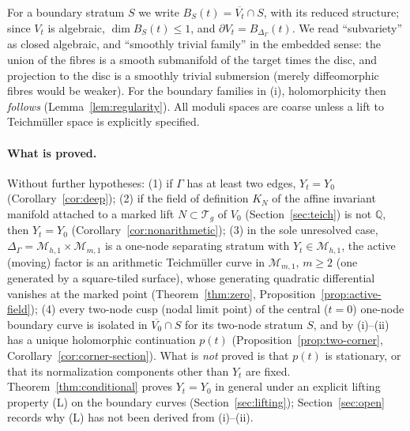 \documentclass[12pt]{article}
\newcommand{\M}{\mathcal M}
\newcommand{\T}{\mathcal T}
\newcommand{\cl}[1]{\overline{#1}}
\theoremstyle{remark}
\begin{document}
For a boundary stratum \(S\) we write \(B_S(t)=\cl{V_t}\cap S\),
with its reduced structure; since \(V_t\) is algebraic,
\(\dim B_S(t)\le1\), and \(\partial V_t=B_{\Delta_\Gamma}(t)\).
We read ``subvariety'' as closed algebraic, and ``smoothly trivial
family'' in the embedded sense: the union of the fibres is a smooth
submanifold of the target times the disc, and projection to the
disc is a smoothly trivial submersion (merely diffeomorphic fibres
would be weaker).
For the boundary families in (i), holomorphicity then
\emph{follows} (Lemma~\ref{lem:regularity}). All moduli spaces are
coarse unless a lift to Teichm\"uller space is explicitly specified.

\paragraph{What is proved.}
Without further hypotheses: (1) if \(\Gamma\) has at least two
edges, \(Y_t=Y_0\) (Corollary~\ref{cor:deep}); (2) if the field of
definition \(K_N\) of the affine invariant manifold attached to a
marked lift \(N\subset\T_g\) of \(V_0\) (Section~\ref{sec:teich}) is
not \(\mathbb Q\), then \(Y_t=Y_0\)
(Corollary~\ref{cor:nonarithmetic}); (3) in the sole unresolved case,
\(\Delta_\Gamma=\M_{h,1}\times\M_{m,1}\) is a one-node separating
stratum with \(Y_t\in\M_{h,1}\), the active (moving) factor is an
arithmetic Teichm\"uller curve in \(\M_{m,1}\), \(m\ge2\) (one
generated by a square-tiled surface), whose generating quadratic
differential vanishes at the marked point
(Theorem~\ref{thm:zero}, Proposition~\ref{prop:active-field});
(4) every two-node cusp (nodal limit point) of the central (\(t=0\))
one-node boundary curve is isolated in \(\cl{V_0}\cap S\) for its
two-node stratum \(S\), and by (i)--(ii) has a unique holomorphic
continuation
\(p(t)\) (Proposition~\ref{prop:two-corner},
Corollary~\ref{cor:corner-section}).
What is \emph{not} proved is that \(p(t)\) is stationary, or that
its normalization components other than \(Y_t\) are fixed.
Theorem~\ref{thm:conditional} proves \(Y_t=Y_0\) in general under an
explicit lifting property (L) on the boundary curves
(Section~\ref{sec:lifting}); Section~\ref{sec:open} records why (L)
has not been derived from (i)--(ii).
\end{document}
